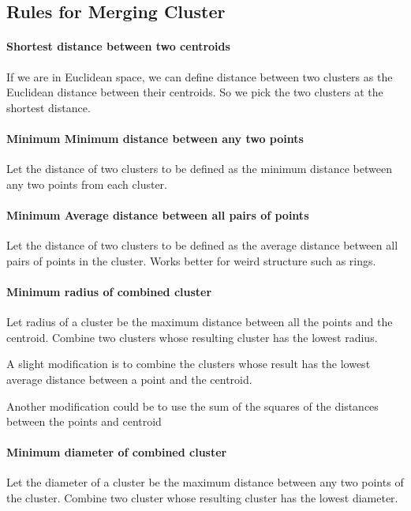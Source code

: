 \subsection{Rules for Merging Cluster} 
\paragraph{Shortest distance between two centroids} If we are in Euclidean space, we can define distance between two clusters as the Euclidean distance between their centroids. So we pick the two clusters at the shortest distance. 

\paragraph{Minimum Minimum distance between any two points} Let the distance of two clusters to be defined as the minimum distance between any two points from each cluster. 

\paragraph{Minimum Average distance between all pairs of points} Let the distance of two clusters to be defined as the average distance between all pairs of points in the cluster. Works better for weird structure such as rings. 

\paragraph{Minimum radius of combined cluster} Let radius of a cluster be the maximum distance between all the points and the centroid. Combine two clusters whose resulting cluster has the lowest radius. 

A slight modification is to combine the clusters whose result has the lowest average distance between a point and the centroid.  

Another modification could be to use the sum of the squares of the distances between the points and centroid

\paragraph{Minimum diameter of combined cluster} Let the diameter of a cluster be the maximum distance between any two points of the cluster. Combine two cluster whose resulting cluster has the lowest diameter. 



